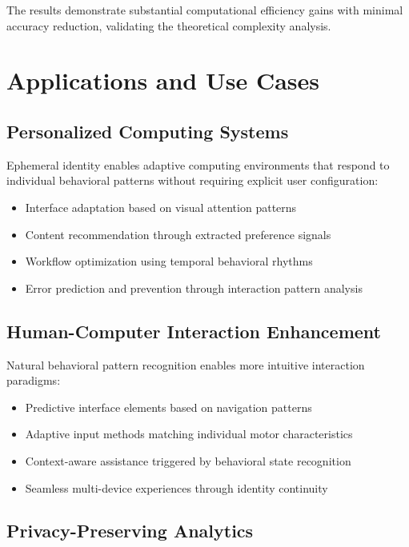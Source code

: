 \documentclass[12pt,a4paper]{article}
\begin{document}
The results demonstrate substantial computational efficiency gains with minimal accuracy reduction, validating the theoretical complexity analysis.

\section{Applications and Use Cases}

\subsection{Personalized Computing Systems}

Ephemeral identity enables adaptive computing environments that respond to individual behavioral patterns without requiring explicit user configuration:

\begin{itemize}
\item Interface adaptation based on visual attention patterns
\item Content recommendation through extracted preference signals
\item Workflow optimization using temporal behavioral rhythms
\item Error prediction and prevention through interaction pattern analysis
\end{itemize}

\subsection{Human-Computer Interaction Enhancement}

Natural behavioral pattern recognition enables more intuitive interaction paradigms:

\begin{itemize}
\item Predictive interface elements based on navigation patterns
\item Adaptive input methods matching individual motor characteristics
\item Context-aware assistance triggered by behavioral state recognition
\item Seamless multi-device experiences through identity continuity
\end{itemize}

\subsection{Privacy-Preserving Analytics}
\end{document}
